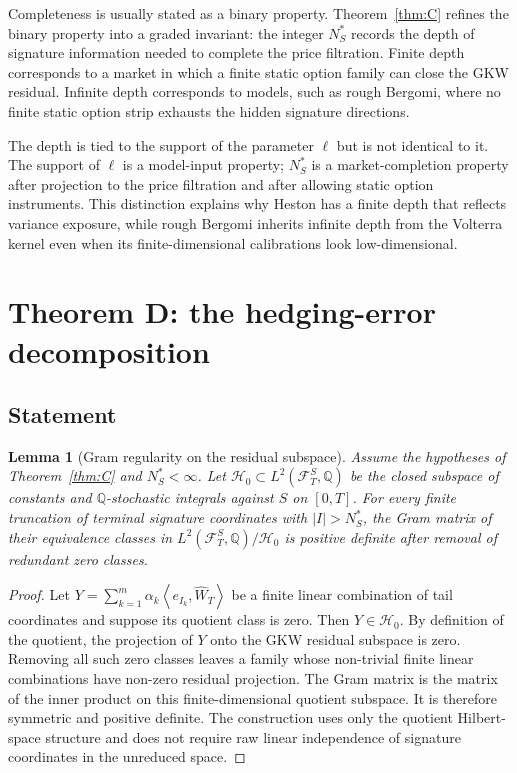 \documentclass[11pt,oneside]{article}
\theoremstyle{plain}
\newtheorem{lemma}[theorem]{Lemma}
\theoremstyle{definition}
\theoremstyle{remark}
\newcommand{\Q}{\mathbb{Q}}
\newcommand{\cW}{\widehat W}
\newcommand{\FS}{\mathcal F^S}
\newcommand{\inner}[2]{\left\langle #1,#2\right\rangle}
\begin{document}
Completeness is usually stated as a binary property. Theorem~\ref{thm:C} refines the binary property into a graded invariant: the integer $N_S^\ast$ records the depth of signature information needed to complete the price filtration. Finite depth corresponds to a market in which a finite static option family can close the GKW residual. Infinite depth corresponds to models, such as rough Bergomi, where no finite static option strip exhausts the hidden signature directions.

The depth is tied to the support of the parameter $\ell$ but is not identical to it. The support of $\ell$ is a model-input property; $N_S^\ast$ is a market-completion property after projection to the price filtration and after allowing static option instruments. This distinction explains why Heston has a finite depth that reflects variance exposure, while rough Bergomi inherits infinite depth from the Volterra kernel even when its finite-dimensional calibrations look low-dimensional.


\section{Theorem D: the hedging-error decomposition}\label{sec:theorem-d}

\subsection{Statement}

\begin{lemma}[Gram regularity on the residual subspace]\label{lem:gram-residual}
Assume the hypotheses of Theorem~\ref{thm:C} and $N_S^\ast<\infty$. Let $\mathcal H_0\subset L^2(\FS_T,\Q)$ be the closed subspace of constants and $\Q$-stochastic integrals against $S$ on $[0,T]$. For every finite truncation of terminal signature coordinates with $|I|>N_S^\ast$, the Gram matrix of their equivalence classes in $L^2(\FS_T,\Q)/\mathcal H_0$ is positive definite after removal of redundant zero classes.
\end{lemma}

\begin{proof}
Let $Y=\sum_{k=1}^m\alpha_k\inner{e_{I_k}}{\cW_T}$ be a finite linear combination of tail coordinates and suppose its quotient class is zero. Then $Y\in\mathcal H_0$. By definition of the quotient, the projection of $Y$ onto the GKW residual subspace is zero. Removing all such zero classes leaves a family whose non-trivial finite linear combinations have non-zero residual projection. The Gram matrix is the matrix of the inner product on this finite-dimensional quotient subspace. It is therefore symmetric and positive definite. The construction uses only the quotient Hilbert-space structure and does not require raw linear independence of signature coordinates in the unreduced space.
\end{proof}
\end{document}
